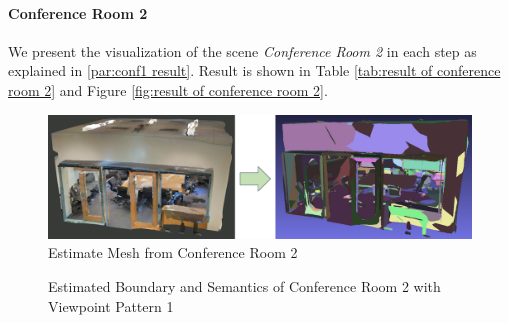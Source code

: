 \documentclass[11pt, a4paper,oneside,chapterprefix=false]{scrbook}
\begin{document}
\paragraph{Conference Room 2}

We present the visualization of the scene \textit{Conference Room 2} in each step as explained in \ref{par:conf1 result}. Result is shown in Table \ref{tab:result of conference room 2} and Figure \ref{fig:result of conference room 2}.

\vspace{10pt}

\begin{figure}[H]
    \centering
    \includegraphics*[width=1.0\textwidth]{figures/estimate conf2.png}
    \caption{Estimate Mesh from Conference Room 2}
    \label{fig:estimate mesh from conference room 2}
\end{figure}

\begin{figure}[H]
    \centering
      \label{fig:conf2 b 200 0} \hfill
     \label{fig:conf2 s 200 0}
    \caption{Estimated Boundary and Semantics of Conference Room 2 with Viewpoint Pattern 1}
    \label{fig:conf2 0}
\end{figure}
\end{document}
